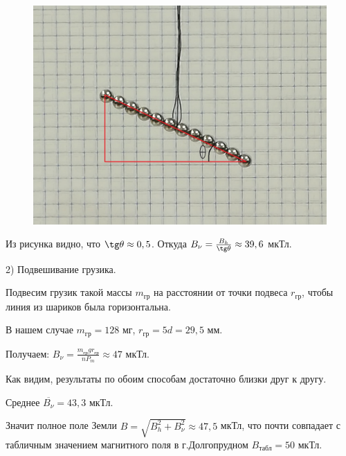 \documentclass[a4paper,12pt]{article} %
\begin{document}
\begin{figure}[h!]
	\centering
	\includegraphics[scale=0.5]{angleMes.jpg}
\end{figure}

Из рисунка видно, что $\tg\theta \approx 0,5$. Откуда $B_{\nu} = \frac{B_h}{\tg\theta} \approx 39,6$ мкТл.

\vspace{10mm}
2) Подвешивание грузика.

Подвесим грузик такой массы $m_{\text{гр}}$ на расстоянии от точки подвеса $r_{\text{гр}}$, чтобы линия из шариков была горизонтальна.

В нашем случае $m_{\text{гр}} = 128$ мг, $r_{\text{гр}} = 5d = 29,5$ мм.

Получаем: $B_{\nu} = \frac{m_{\text{гр}}gr_{\text{гр}}}{nP_m} \approx 47$ мкТл.

\vspace{12mm}

Как видим, результаты по обоим способам достаточно близки друг к другу.

Среднее $\overline{B_{\nu}} = 43,3$ мкТл.

Значит полное поле Земли $B = \sqrt{B_{h}^2 + B_{\nu}^2} \approx 47,5$ мкТл, что почти совпадает с табличным значением магнитного поля в г.Долгопрудном $B_{\text{табл}} = 50$ мкТл.
\end{document}

